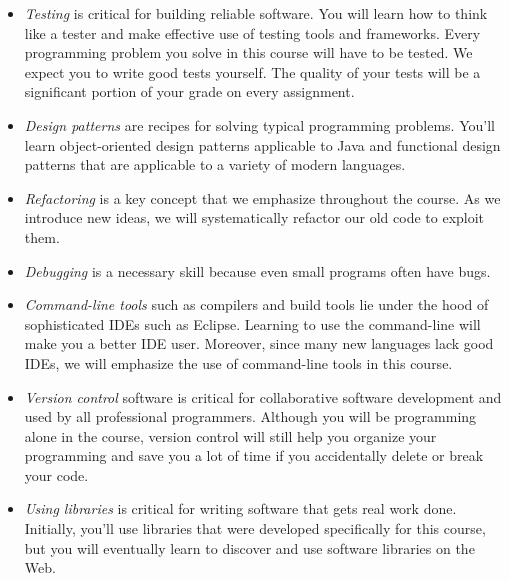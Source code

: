 \documentclass{book}
\begin{document}
\begin{itemize}

\item \emph{Testing} is critical for building reliable software. You will learn how
  to think like a tester and make effective use of testing tools and frameworks.
  Every programming problem you solve in this course will have to be tested. We
  expect you to write good tests yourself. The quality of your tests will be a
  significant portion of your grade on every assignment.

\item \emph{Design patterns} are recipes for solving typical programming
  problems. You'll learn object-oriented design patterns applicable to Java and
  functional design patterns that are applicable to a variety of modern
  languages.

\item \emph{Refactoring} is a key concept that we emphasize throughout the
  course. As we introduce new ideas, we will systematically refactor our old
  code to exploit them.

\item \emph{Debugging} is a necessary skill because even small programs often
  have bugs.

\item \emph{Command-line tools} such as compilers and build tools lie under the
  hood of sophisticated IDEs such as Eclipse. Learning to use the command-line
  will make you a better IDE user. Moreover, since many new languages lack good
  IDEs, we will emphasize the use of command-line tools in this course.

\item \emph{Version control} software is critical for collaborative software
  development and used by all professional programmers. Although you will be
  programming alone in the course, version control will still help you organize
  your programming and save you a lot of time if you accidentally delete or
  break your code.

\item \emph{Using libraries} is critical for writing software that gets real
  work done. Initially, you'll use libraries that were developed specifically
  for this course, but you will eventually learn to discover and use software
  libraries on the Web.

\end{itemize}
\end{document}
